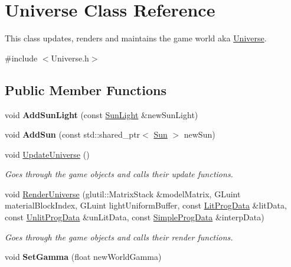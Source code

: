 \hypertarget{class_universe}{\section{Universe Class Reference}
\label{class_universe}
}


This class updates, renders and maintains the game world aka \hyperlink{class_universe}{Universe}.  




{\ttfamily \#include $<$Universe.\-h$>$}

\subsection*{Public Member Functions}
\begin{DoxyCompactItemize}
\item 
\hypertarget{class_universe_a37bff5a776da7a803b5548f4376eba00}{void {\bfseries Add\-Sun\-Light} (const \hyperlink{class_sun_light}{Sun\-Light} \&new\-Sun\-Light)}\label{class_universe_a37bff5a776da7a803b5548f4376eba00}

\item 
\hypertarget{class_universe_a60a3909961a95ae35158c63f84ca0182}{void {\bfseries Add\-Sun} (const std\-::shared\-\_\-ptr$<$ \hyperlink{class_sun}{Sun} $>$ new\-Sun)}\label{class_universe_a60a3909961a95ae35158c63f84ca0182}

\item 
\hypertarget{class_universe_acae0ef79d1350457b3824a19134f8a3d}{void \hyperlink{class_universe_acae0ef79d1350457b3824a19134f8a3d}{Update\-Universe} ()}\label{class_universe_acae0ef79d1350457b3824a19134f8a3d}

\begin{DoxyCompactList}\small\item\em Goes through the game objects and calls their update functions. \end{DoxyCompactList}\item 
\hypertarget{class_universe_a9293cf3a90d969d42ba68f17534603a4}{void \hyperlink{class_universe_a9293cf3a90d969d42ba68f17534603a4}{Render\-Universe} (glutil\-::\-Matrix\-Stack \&model\-Matrix, G\-Luint material\-Block\-Index, G\-Luint light\-Uniform\-Buffer, const \hyperlink{struct_lit_prog_data}{Lit\-Prog\-Data} \&lit\-Data, const \hyperlink{struct_unlit_prog_data}{Unlit\-Prog\-Data} \&un\-Lit\-Data, const \hyperlink{struct_simple_prog_data}{Simple\-Prog\-Data} \&interp\-Data)}\label{class_universe_a9293cf3a90d969d42ba68f17534603a4}

\begin{DoxyCompactList}\small\item\em Goes through the game objects and calls their render functions. \end{DoxyCompactList}\item 
\hypertarget{class_universe_a294abbc29adcdb9d92b1e9a31605d952}{void {\bfseries Set\-Gamma} (float new\-World\-Gamma)}\label{class_universe_a294abbc29adcdb9d92b1e9a31605d952}

\end{DoxyCompactItemize}
